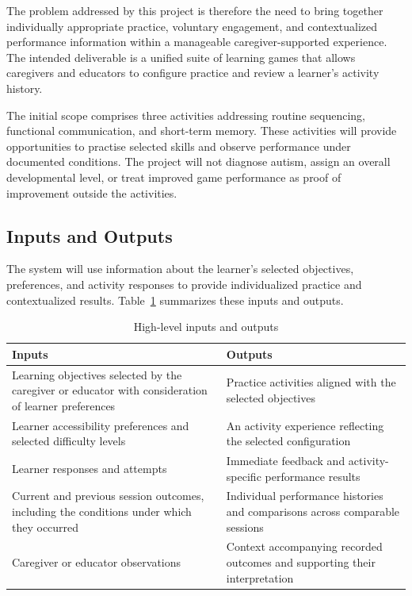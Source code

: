 \documentclass{article}
\begin{document}
The problem addressed by this project is therefore the need to bring together
individually appropriate practice, voluntary engagement, and contextualized
performance information within a manageable caregiver-supported experience. The
intended deliverable is a unified suite of learning games that allows caregivers
and educators to configure practice and review a learner's activity history.

The initial scope comprises three activities addressing routine sequencing,
functional communication, and short-term memory. These activities will provide
opportunities to practise selected skills and observe performance under
documented conditions. The project will not diagnose autism, assign an overall
developmental level, or treat improved game performance as proof of improvement
outside the activities.

\subsection{Inputs and Outputs}
The system will use information about the learner's selected objectives,
preferences, and activity responses to provide individualized practice and
contextualized results. Table~\ref{TblInputsOutputs} summarizes these inputs and
outputs.

\begin{table}[htbp]
\centering
\caption{High-level inputs and outputs}
\label{TblInputsOutputs}
\begin{tabularx}{\textwidth}{@{}XX@{}}
\toprule
\textbf{Inputs} & \textbf{Outputs} \\
\midrule
Learning objectives selected by the caregiver or educator with consideration
of learner preferences & Practice activities aligned with the selected
objectives \\
\addlinespace
Learner accessibility preferences and selected difficulty levels
& An activity experience reflecting the selected configuration \\
\addlinespace
Learner responses and attempts & Immediate feedback
and activity-specific performance results \\
\addlinespace
Current and previous session outcomes, including the conditions under which
they occurred & Individual performance histories and comparisons across
comparable sessions \\
\addlinespace
Caregiver or educator observations & Context accompanying recorded outcomes
and supporting their interpretation \\
\bottomrule
\end{tabularx}
\end{table}
\end{document}
